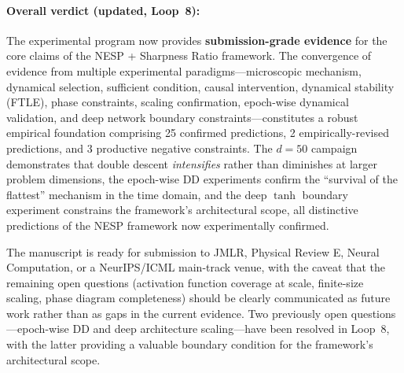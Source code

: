 \documentclass[
  journal=largetwo,
  simfonts=false,
  year=2025,
  volume=37,
]{cup-journal}
\begin{document}
\paragraph{Overall verdict (updated, Loop~8):}

The experimental program now provides \textbf{submission-grade evidence} for the core claims of the NESP + Sharpness Ratio framework. The convergence of evidence from multiple experimental paradigms---microscopic mechanism, dynamical selection, sufficient condition, causal intervention, dynamical stability (FTLE), phase constraints, scaling confirmation, epoch-wise dynamical validation, and deep network boundary constraints---constitutes a robust empirical foundation comprising 25 confirmed predictions, 2 empirically-revised predictions, and 3 productive negative constraints. The $d=50$ campaign demonstrates that double descent \textit{intensifies} rather than diminishes at larger problem dimensions, the epoch-wise DD experiments confirm the ``survival of the flattest'' mechanism in the time domain, and the deep $\tanh$ boundary experiment constrains the framework's architectural scope, all distinctive predictions of the NESP framework now experimentally confirmed.

The manuscript is ready for submission to JMLR, Physical Review E, Neural Computation, or a NeurIPS/ICML main-track venue, with the caveat that the remaining open questions (activation function coverage at scale, finite-size scaling, phase diagram completeness) should be clearly communicated as future work rather than as gaps in the current evidence. Two previously open questions---epoch-wise DD and deep architecture scaling---have been resolved in Loop~8, with the latter providing a valuable boundary condition for the framework's architectural scope.


\clearpage

\nocite{*}
\printbibliography
\end{document}
